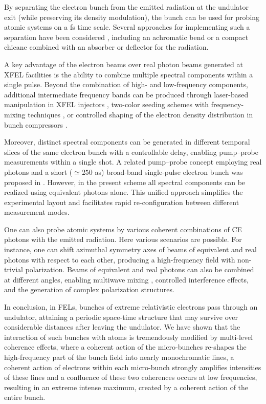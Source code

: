 \documentclass[prl, twocolumn, floatfix]{revtex4}
\begin{document}
By separating the electron bunch from the emitted radiation
at the undulator exit (while preserving its density modulation),
the bunch can be used for probing atomic systems on a fs time scale.
Several approaches for implementing such a separation
have been considered  \cite{ES-6},
including an achromatic bend or a compact chicane combined with an
absorber or deflector for the radiation.

A key advantage of the electron beams over real photon beams generated at XFEL
facilities is the ability to combine multiple spectral components
within a single pulse. Beyond the combination of high- and low-frequency components,
additional intermediate frequency bands can be produced through laser-based manipulation
in XFEL injectors \cite{new-1,new-2}, two-color seeding schemes \cite{new-3}
with frequency-mixing techniques \cite{new-4},
or controlled shaping of the electron density distribution
in bunch compressors \cite{FLASH}.

Moreover, distinct spectral components can be generated in different temporal slices of the
same electron bunch with a controllable delay, enabling pump–probe measurements
within a single shot. A related pump–probe concept employing real photons and
a short ($\simeq 250$ as) broad-band single-pulse electron bunch was proposed
in \cite{cesar}. However, in the present scheme all spectral components
can be realized using equivalent photons alone.
This unified approach simplifies the experimental layout
and facilitates rapid re-configuration between different measurement modes.

One can also probe atomic systems
by various coherent combinations of CE photons with
the emitted radiation.
Here various scenarios are possible.
For instance, one can shift azimuthal symmetry axes
of beams of equivalent and real photons
with respect to each other, producing
a high-frequency field with non-trivial polarization.
Beams of equivalent and real photons can
also be combined at different angles,
enabling multiwave mixing \cite{new-5},
controlled interference effects,
and the generation of complex polarization structures.

\vspace{0.25cm}

In conclusion, in FELs, bunches of extreme relativistic electrons
pass through an undulator, attaining a periodic space-time structure
that may survive over considerable distances after leaving the undulator.
We have shown that the interaction of such bunches with atoms
is tremendously modified by multi-level coherence effects,
where a coherent action of the micro-bunches
re-shapes the high-frequency part of the bunch field into nearly
monochromatic lines, a coherent action of electrons within each micro-bunch
strongly amplifies intensities of these lines and
a confluence of these two coherences occurs at low frequencies,
resulting in an extreme intense
maximum, created by a coherent action of the entire bunch.
\end{document}
